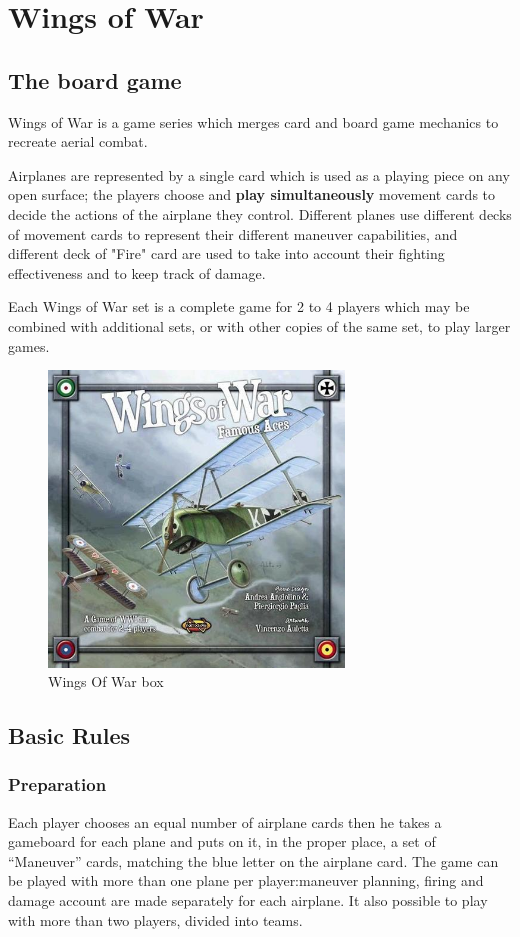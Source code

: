 
\chapter{Wings of War}

\section{The board game}

Wings of War is a game series which merges card and board game mechanics to recreate aerial combat.

Airplanes are represented by a single card which is used as a playing piece on any open surface; the players choose and \textbf{play simultaneously} movement cards to decide the actions of the airplane they control. Different planes use different decks of movement cards to represent their different maneuver capabilities, and different deck of "Fire" card are used to take into account their fighting effectiveness and to keep track of damage.

Each Wings of War set is a complete game for 2 to 4 players which may be combined with additional sets, or with other copies of the same set, to play larger games.

\begin{figure}
  \centering
      \includegraphics[width=0.7\textwidth]{images/wow.jpg}
  \caption{Wings Of War box}
\end{figure}

\section{Basic Rules}
\subsection{Preparation}
Each player chooses an equal number of airplane cards then he takes a gameboard for each plane and puts on it, in the proper place, a set of “Maneuver” cards, matching the blue letter on the airplane card.
The game can be played with more than one plane per player:maneuver planning, firing and damage account are made separately for each airplane. It also possible to play with more than two players, divided into teams.
